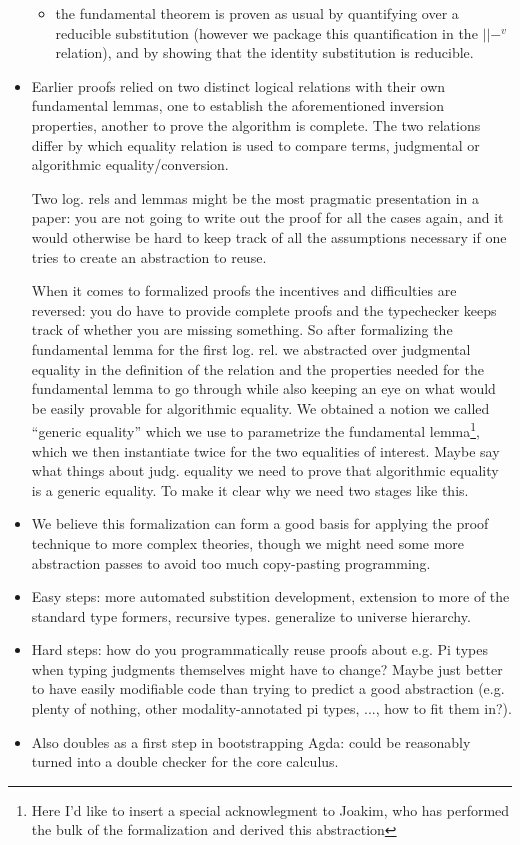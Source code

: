 \documentclass{book}
\begin{document}
\begin{itemize}
\begin{itemize}
   \item the fundamental theorem is proven as usual by quantifying over a
   reducible substitution (however we package this quantification in
   the $||-^v$ relation), and by showing that the identity substitution
   is reducible.
   \end{itemize}
   
 \item Earlier proofs relied on two distinct logical relations with their
 own fundamental lemmas, one to establish the aforementioned inversion
 properties, another to prove the algorithm is complete.
 The two relations differ by which equality relation is used to
 compare terms, judgmental or algorithmic equality/conversion.
 
 Two log. rels and lemmas might be the most pragmatic presentation in
 a paper: you are not going to write out the proof for all the cases
 again, and it would otherwise be hard to keep track of all the
 assumptions necessary if one tries to create an abstraction to reuse.

 When it comes to formalized proofs the incentives and difficulties
 are reversed: you do have to provide complete proofs and the
 typechecker keeps track of whether you are missing something. So
 after formalizing the fundamental lemma for the first log. rel. we
 abstracted over judgmental equality in the definition of the relation
 and the properties needed for the fundamental lemma to go through
 while also keeping an eye on what would be easily provable for
 algorithmic equality.  We obtained a notion we called ``generic
 equality'' which we use to parametrize the fundamental
 lemma\footnote{Here I'd like to insert a special acknowlegment to
   Joakim, who has performed the bulk of the formalization and derived
   this abstraction}, which we then instantiate twice for the two
 equalities of interest.
 Maybe say what things about judg. equality we need to prove that
   algorithmic equality is a generic equality. To make it clear why we need two stages like this.
   
 \item We believe this formalization can form a good basis for applying
 the proof technique to more complex theories, though we might need
 some more abstraction passes to avoid too much copy-pasting programming.

 \item Easy steps: more automated substition development, extension to
 more of the standard type formers, recursive types. generalize to universe hierarchy.

 \item Hard steps: how do you programmatically reuse proofs about e.g. Pi
 types when typing judgments themselves might have to change? Maybe
 just better to have easily modifiable code than trying to predict a
 good abstraction (e.g. plenty of nothing, other modality-annotated pi types, ..., how to fit them in?).
 
 \item Also doubles as a first step in bootstrapping Agda: could be
 reasonably turned into a double checker for the core calculus.
\end{itemize}
 
\end{document}
